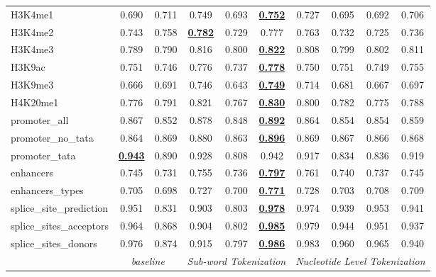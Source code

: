\begin{table*}[h!]
\begin{center}
\begin{tabular}{l|cc|ccc|cccc}
H3K4me1 & 0.690 & 0.711 & 0.749 & 0.693 & {\ul \textbf{0.752}} & 0.727 & 0.695 & 0.692 & 0.706 \\
H3K4me2 & 0.743 & 0.758 & {\ul \textbf{0.782}} & 0.729 & 0.777 & 0.763 & 0.732 & 0.725 & 0.736 \\
H3K4me3 & 0.789 & 0.790 & 0.816 & 0.800 & {\ul \textbf{0.822}} & 0.808 & 0.799 & 0.802 & 0.811 \\
H3K9ac & 0.751 & 0.746 & 0.776 & 0.737 & {\ul \textbf{0.778}} & 0.750 & 0.751 & 0.749 & 0.755 \\
H3K9me3 & 0.666 & 0.691 & 0.746 & 0.643 & {\ul \textbf{0.749}} & 0.714 & 0.681 & 0.667 & 0.697 \\
H4K20me1 & 0.776 & 0.791 & 0.821 & 0.767 & {\ul \textbf{0.830}} & 0.800 & 0.782 & 0.775 & 0.788 \\
promoter\_all & 0.867 & 0.852 & 0.878 & 0.848 & {\ul \textbf{0.892}} & 0.864 & 0.854 & 0.854 & 0.859 \\
promoter\_no\_tata & 0.864 & 0.869 & 0.880 & 0.863 & {\ul \textbf{0.896}} & 0.869 & 0.867 & 0.866 & 0.868 \\
promoter\_tata & {\ul \textbf{0.943}} & 0.890 & 0.928 & 0.808 & 0.942 & 0.917 & 0.834 & 0.836 & 0.919 \\
enhancers & 0.745 & 0.731 & 0.755 & 0.736 & {\ul \textbf{0.797}} & 0.761 & 0.740 & 0.737 & 0.745 \\
enhancers\_types & 0.705 & 0.698 & 0.727 & 0.700 & {\ul \textbf{0.771}} & 0.728 & 0.703 & 0.708 & 0.709 \\
splice\_site\_prediction & 0.951 & 0.831 & 0.903 & 0.803 & {\ul \textbf{0.978}} & 0.974 & 0.939 & 0.953 & 0.941 \\
splice\_sites\_acceptors & 0.964 & 0.868 & 0.904 & 0.802 & {\ul \textbf{0.985}} & 0.979 & 0.944 & 0.951 & 0.937 \\
splice\_sites\_donors & 0.976 & 0.874 & 0.915 & 0.797 & {\ul \textbf{0.986}} & 0.983 & 0.960 & 0.965 & 0.940 \\
\hline
\multicolumn{1}{l|}{} & \multicolumn{2}{c|}{\textit{baseline}} & \multicolumn{3}{c|}{\textit{Sub-word Tokenization}} & \multicolumn{4}{c}{\textit{Nucleotide Level Tokenization}} \\ \hline
\end{tabular}
\end{center}
\end{table*}
